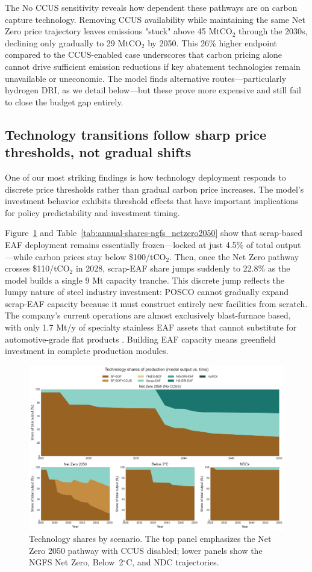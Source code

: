 \documentclass[preprint,1p,authoryear]{elsarticle}
\begin{document}
The No CCUS sensitivity reveals how dependent these pathways are on carbon capture technology. Removing CCUS availability while maintaining the same Net Zero price trajectory leaves emissions "stuck" above 45 MtCO$_2$ through the 2030s, declining only gradually to 29 MtCO$_2$ by 2050. This 26\% higher endpoint compared to the CCUS-enabled case underscores that carbon pricing alone cannot drive sufficient emission reductions if key abatement technologies remain unavailable or uneconomic. The model finds alternative routes—particularly hydrogen DRI, as we detail below—but these prove more expensive and still fail to close the budget gap entirely.

\subsection{Technology transitions follow sharp price thresholds, not gradual shifts}

One of our most striking findings is how technology deployment responds to discrete price thresholds rather than gradual carbon price increases. The model's investment behavior exhibits threshold effects that have important implications for policy predictability and investment timing.

Figure~\ref{fig:technology-transition} and Table~\ref{tab:annual-shares-ngfs_netzero2050} show that scrap-based EAF deployment remains essentially frozen—locked at just 4.5\% of total output—while carbon prices stay below \$100/tCO$_2$. Then, once the Net Zero pathway crosses \$110/tCO$_2$ in 2028, scrap-EAF share jumps suddenly to 22.8\% as the model builds a single 9 Mt capacity tranche. This discrete jump reflects the lumpy nature of steel industry investment: POSCO cannot gradually expand scrap-EAF capacity because it must construct entirely new facilities from scratch. The company's current operations are almost exclusively blast-furnace based, with only 1.7 Mt/y of specialty stainless EAF assets that cannot substitute for automotive-grade flat products \citep{POSCO2023SR}. Building EAF capacity means greenfield investment in complete production modules.

\begin{figure}[!t]
  \centering
  \includegraphics[width=0.8\linewidth]{technology_transition}
  \caption{Technology shares by scenario. The top panel emphasizes the Net Zero 2050 pathway with CCUS disabled; lower panels show the NGFS Net Zero, Below~2$^\circ$C, and NDC trajectories.}
  \label{fig:technology-transition}
\end{figure}
\end{document}
